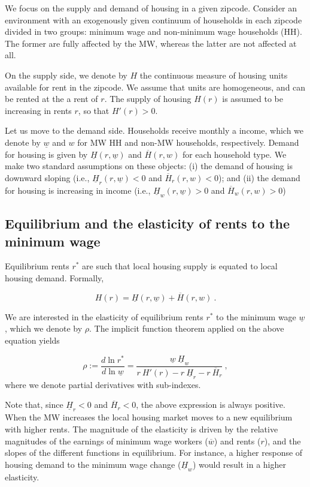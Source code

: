 We focus on the supply and demand of housing in a given zipcode. Consider an environment with 
an exogenously given continuum of households in each zipcode divided in two groups: minimum wage 
and non-minimum wage households (HH). The former are fully affected by the MW, whereas the latter 
are not affected at all.

On the supply side, we denote by $H$ the continuous measure of housing units available for rent 
in the zipcode. We assume that units are homogeneous, and can be rented at the a rent of $r$. The 
supply of housing $H(r)$ is assumed to be increasing in rents $r$, so that $H'(r) > 0$.

Let us move to the demand side. Households receive monthly a income, which we denote by 
$\underline{w}$ and $w$ for MW HH and non-MW households, respectively. Demand for housing is given 
by $\underline{H}(r, \underline{w})$ and $\overline{H}(r, w)$ for each household type. We make two 
standard assumptions on these objects: (i) the demand of housing is downward sloping (i.e., 
$\underline{H}_r(r, \underline{w}) < 0$ and $\overline{H}_r(r, w) < 0$); and (ii) the demand for 
housing is increasing in income (i.e., $\underline{H}_w(r, \underline{w}) > 0$ and $\overline{H}_w(r, 
w) > 0$)


\subsection{Equilibrium and the elasticity of rents to the minimum wage}

Equilibrium rents $r^*$ are such that local housing supply is equated to local housing demand. 
Formally,

\begin{equation*}\label{eq:model-eq}
H(r) =  \underline{H}(r, \underline{w}) + \overline{H}(r, w) \ .
\end{equation*}

We are interested in the elasticity of equilibrium rents $r^*$ to the minimum wage $\underline{w}$, 
which we denote by $\rho$. The implicit function theorem applied on the above equation yields

\begin{equation}\label{eq:model-elasticity}
\rho := \frac{d \ln r^*}{d \ln \underline{w}} 
= \frac{\underline{w} \ \underline{H}_w}
{r\  H'(r) - r \ \underline{H}_r - r \ \overline{H}_r} \ ,
\end{equation}
where we denote partial derivatives with sub-indexes.

Note that, since $\underline{H}_r < 0$ and $\overline{H}_r < 0$, the above expression is always 
positive. When the MW increases the local housing market moves to a new equilibrium with higher 
rents. The magnitude of the elasticity is driven by the relative magnitudes of the earnings of 
minimum wage workers ($\overline{w}$) and rents ($r$), and the slopes of the different 
functions in equilibrium. For instance, a higher response of housing demand to the minimum wage 
change ($\underline{H}_w$) would result in a higher elasticity.